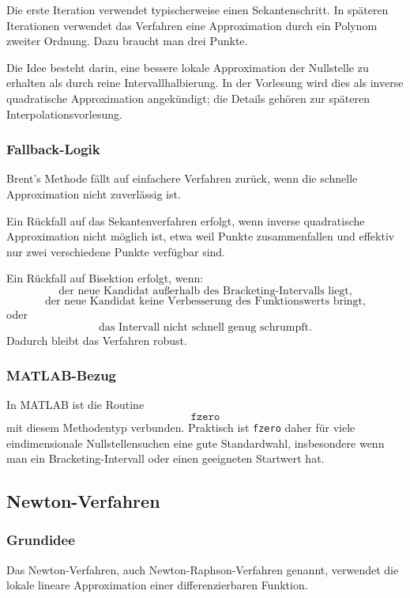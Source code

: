 \documentclass[10pt, letterpaper]{article}
\begin{document}
Die erste Iteration verwendet typischerweise einen Sekantenschritt. In späteren Iterationen verwendet das Verfahren eine Approximation durch ein Polynom zweiter Ordnung. Dazu braucht man drei Punkte.

Die Idee besteht darin, eine bessere lokale Approximation der Nullstelle zu erhalten als durch reine Intervallhalbierung. In der Vorlesung wird dies als inverse quadratische Approximation angekündigt; die Details gehören zur späteren Interpolationsvorlesung.

\subsubsection{Fallback-Logik}

Brent's Methode fällt auf einfachere Verfahren zurück, wenn die schnelle Approximation nicht zuverlässig ist.

Ein Rückfall auf das Sekantenverfahren erfolgt, wenn inverse quadratische Approximation nicht möglich ist, etwa weil Punkte zusammenfallen und effektiv nur zwei verschiedene Punkte verfügbar sind.

Ein Rückfall auf Bisektion erfolgt, wenn:
\[
\text{der neue Kandidat außerhalb des Bracketing-Intervalls liegt,}
\]
\[
\text{der neue Kandidat keine Verbesserung des Funktionswerts bringt,}
\]
oder
\[
\text{das Intervall nicht schnell genug schrumpft.}
\]
Dadurch bleibt das Verfahren robust.

\subsubsection{MATLAB-Bezug}

In MATLAB ist die Routine
\[
\texttt{fzero}
\]
mit diesem Methodentyp verbunden. Praktisch ist \texttt{fzero} daher für viele eindimensionale Nullstellensuchen eine gute Standardwahl, insbesondere wenn man ein Bracketing-Intervall oder einen geeigneten Startwert hat.

\subsection{Newton-Verfahren}

\subsubsection{Grundidee}

Das Newton-Verfahren, auch Newton-Raphson-Verfahren genannt, verwendet die lokale lineare Approximation einer differenzierbaren Funktion.
\end{document}
